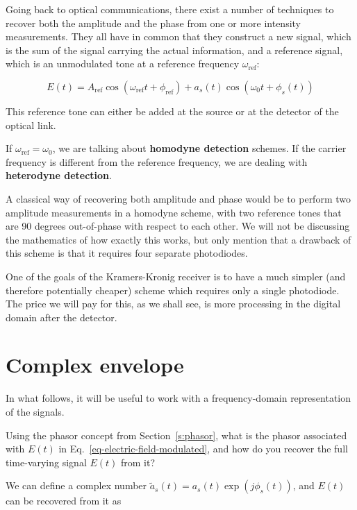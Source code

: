 Going back to optical communications, there exist a number of techniques to recover both the amplitude and the phase from one or more intensity measurements. They all have in common that they construct a new signal, which is the sum of the signal carrying the actual information, and a reference signal, which is an unmodulated tone at a reference frequency $\omega_\mathrm{ref}$:

\begin{equation}
E(t) = A_\mathrm{ref} \cos\left(\omega_\mathrm{ref} t + \phi_\mathrm{ref}\right) + a_s(t) \cos\left(\omega_0 t + \phi_s(t)\right)  
\end{equation}

This reference tone can either be added at the source or at the detector of the optical link.

If $\omega_\mathrm{ref} = \omega_0$, we are talking about \textbf{homodyne detection} schemes. If the carrier frequency is different from the reference frequency, we are dealing with \textbf{heterodyne detection}.

A classical way of recovering both amplitude and phase would be to perform two amplitude measurements in a homodyne scheme, with two reference tones that are 90 degrees out-of-phase with respect to each other. We will not be discussing the mathematics of how exactly this works, but only mention that a drawback of this scheme is that it requires four separate photodiodes.

One of the goals of the Kramers-Kronig receiver is to have a much simpler (and therefore potentially cheaper) scheme which requires only a single photodiode. The price we will pay for this, as we shall see, is more processing in the digital domain after the detector.


\pagebreak

\section{Complex envelope}

In what follows, it will be useful to work with a frequency-domain representation of the signals.

\begin{cue}
Using the phasor concept from Section~\ref{s:phasor}, what is the phasor associated with $E(t)$ in Eq.~\ref{eq-electric-field-modulated}, and how do you recover the full time-varying signal $E(t)$ from it?    
\end{cue}

We can define a complex number $\tilde{a}_s(t)=a_s(t) \exp(j \phi_s(t))$,
and $E(t)$ can be recovered from it as

